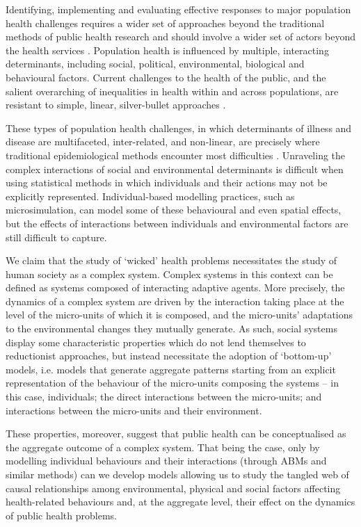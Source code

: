 \documentclass[review]{elsarticle}
\begin{document}
Identifying, implementing and evaluating effective responses to major population health challenges requires a wider set of approaches beyond the traditional methods of public health research and should involve a wider set of actors beyond the health services \citep{academy2016}. Population health is influenced by multiple, interacting determinants, including social, political, environmental, biological and behavioural factors. Current challenges to the health of the public, and the salient overarching of inequalities in health within and across populations, are resistant to simple, linear, silver-bullet approaches \citep{rutter2017}.

These types of population health challenges, in which determinants of illness and disease are multifaceted, inter-related, and non-linear, are precisely where traditional epidemiological methods encounter most difficulties \citep{galea2010}.  Unraveling the complex interactions of social and environmental determinants is difficult when using statistical methods in which individuals and their actions may not be explicitly represented.  Individual-based modelling practices, such as microsimulation, can model some of these behavioural and even spatial effects, but the effects of interactions between individuals and environmental factors are still difficult to capture.

We claim that the study of `wicked' health problems necessitates the study of human society as a complex system. Complex systems in this context can be defined as systems composed of interacting adaptive agents. More precisely, the dynamics of a complex system are driven by the interaction taking place at the level of the micro-units of which it is composed, and the micro-units' adaptations to the environmental changes they mutually generate. As such, social systems display some characteristic properties which do not lend themselves to reductionist approaches, but instead necessitate the adoption of `bottom-up' models, i.e. models that generate aggregate patterns starting from an explicit representation of the behaviour of the micro-units composing the systems -- in this case, individuals; the direct interactions between the micro-units; and interactions between the micro-units and their environment. 
  
These properties, moreover, suggest that public health can be conceptualised as the aggregate outcome of a complex system.  That being the case, only by modelling individual behaviours and their interactions (through ABMs and similar methods) can we develop models allowing us to study the tangled web of causal relationships among environmental, physical and social factors affecting health-related behaviours and, at the aggregate level, their effect on the dynamics of public health problems.
\end{document}
